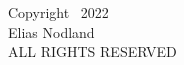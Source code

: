 \begin{center}
\null\vfill
\noindent
Copyright \textcopyright\ 2022 \\
Elias Nodland \\
ALL RIGHTS RESERVED \\
\vspace{2in}
\end{center}
